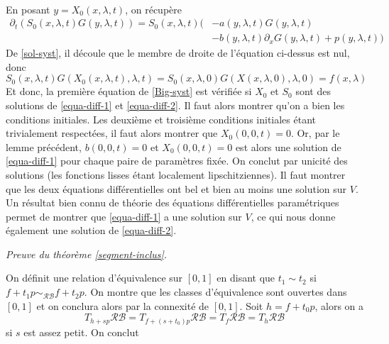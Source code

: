 \documentclass[memoire.tex]{subfiles}
\begin{document}
\begin{preuve}
\begin{equation}
\begin{aligned}
    \end{aligned}
    \end{equation}
    En posant $y=X_0(x,\lambda,t)$, on récupère
    \begin{equation}
    \begin{aligned}      
        \partial_t\left( S_0(x,\lambda,t)G(y,\lambda,t)\right)= S_0(x,\lambda,t)
            \big(&-a(y,\lambda,t)G(y,\lambda,t)\\
            &-b(y,\lambda,t)\partial_x G(y,\lambda,t)+p(y,\lambda,t)\big)
    \end{aligned}
    \end{equation}
    De \ref{sol-syst}, il découle que le membre de droite de l'équation ci-dessus est nul, donc
    \begin{equation}
        S_0(x,\lambda,t)G(X_0(x,\lambda,t),\lambda,t)= S_0(x,\lambda,0)G(X(x,\lambda,0),\lambda,0)=f(x,\lambda)
    \end{equation}
    Et donc, la première équation de \ref{Big-syst} est vérifiée si $X_0$ et $S_0$ sont des solutions de  \ref{equa-diff-1} et 
    \ref{equa-diff-2}. Il faut alors montrer qu'on a bien les conditions initiales. Les deuxième et troisième conditions initiales étant trivialement respectées, il faut alors montrer que $X_0(0,0,t)=0$. Or, par le lemme précédent, $b(0,0,t)=0$ et $X_0(0,0,t)=0$ est alors une solution de \ref{equa-diff-1} pour chaque paire de paramètres fixée. On conclut par unicité des solutions (les fonctions lisses étant localement lipschitziennes). Il faut montrer que les deux équations différentielles ont bel et bien au moins une solution sur $V$. Un résultat bien connu de théorie des équations différentielles paramétriques \cite{HirschSmale1974Dynamical} permet de montrer que \ref{equa-diff-1} a une solution sur $V$, ce qui nous donne également une solution de \ref{equa-diff-2}.
\end{preuve}

{\hypersetup{linkcolor=color-prop}\par\noindent\textcolor{color-prop}{\textit{Preuve du théorème \ref{segment-inclus}.}}\ }
On définit une relation d'équivalence sur $[0,1]$ en disant que $t_1\sim t_2$ si $f+t_1p\sim_{\mathcal{RB}} f+t_2p$. On montre que les classes d'équivalence sont ouvertes dans $[0,1]$ et on conclura alors par la connexité de $[0,1]$. Soit $h=f+t_0p$,
alors on a
\begin{equation*}
    T_{h+sp}\mathcal{RB}
    =T_{f+(s+t_0)p}\mathcal{RB}
    =T_f\mathcal{RB}=T_h\mathcal{RB}
\end{equation*}
si $s$ est assez petit. On conclut
\end{document}
